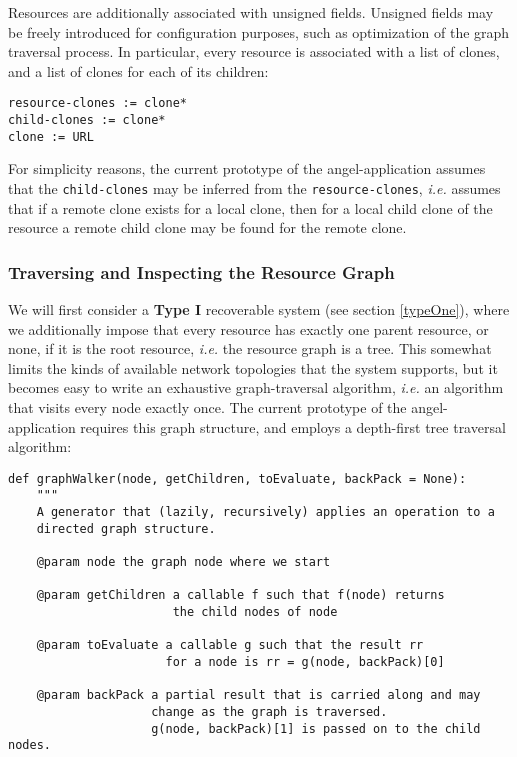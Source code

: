 \documentclass[11pt]{article}
\begin{document}
\begin{mainmatter}
Resources are additionally associated with unsigned fields. Unsigned fields may be freely introduced for configuration purposes, such as optimization of the graph traversal process. In particular, every resource is associated with a list of clones, and a list of clones for each of its children:
\begin{verbatim}
resource-clones := clone*
child-clones := clone*
clone := URL
\end{verbatim}
For simplicity reasons, the current prototype of the angel-application assumes that the \texttt{child-clones} may be inferred from the \texttt{resource-clones}, \emph{i.e.} assumes that if a remote clone exists for a local clone, then for a local child clone of the resource a remote child clone may be found for the remote clone.

\subsubsection{Traversing and Inspecting the Resource Graph}

We will first consider a \textbf{Type I} recoverable system (see section \ref{typeOne}), where we additionally impose that every resource has exactly one parent resource, or none, if it is the root resource, \emph{i.e.} the resource graph is a tree. This somewhat limits the kinds of available network topologies that the system supports, but it becomes easy to write an exhaustive graph-traversal algorithm, \emph{i.e.} an algorithm that visits every node exactly once. The current prototype of the angel-application requires this graph structure, and employs a depth-first tree traversal algorithm:
\begin{verbatim}
def graphWalker(node, getChildren, toEvaluate, backPack = None):
    """
    A generator that (lazily, recursively) applies an operation to a 
    directed graph structure.
    
    @param node the graph node where we start
    
    @param getChildren a callable f such that f(node) returns 
                       the child nodes of node
                       
    @param toEvaluate a callable g such that the result rr
                      for a node is rr = g(node, backPack)[0]
    
    @param backPack a partial result that is carried along and may 
                    change as the graph is traversed. 
                    g(node, backPack)[1] is passed on to the child nodes.
                    

\end{verbatim}
\end{mainmatter}
\end{document}
